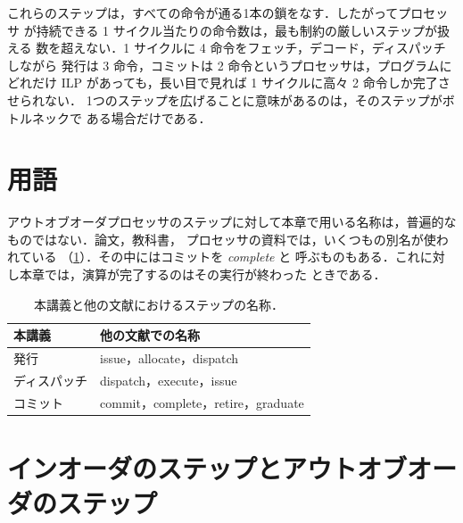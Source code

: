 \documentclass[../main.tex]{subfiles}
\begin{document}
これらのステップは，すべての命令が通る1本の鎖をなす．したがってプロセッサ
が持続できる 1 サイクル当たりの命令数は，最も制約の厳しいステップが扱える
数を超えない．1 サイクルに 4 命令をフェッチ，デコード，ディスパッチしながら
発行は 3 命令，コミットは 2 命令というプロセッサは，プログラムにどれだけ
ILP があっても，長い目で見れば 1 サイクルに高々 2 命令しか完了させられない．
1つのステップを広げることに意味があるのは，そのステップがボトルネックで
ある場合だけである．

\section{用語}
\label{sec:l08-terminology}

アウトオブオーダプロセッサのステップに対して本章で用いる名称は，普遍的な
ものではない．論文，教科書，
プロセッサの資料では，いくつもの別名が使われている
（\cref{tab:l08-terminology}）．その中にはコミットを \emph{complete} と
呼ぶものもある．これに対し本章では，演算が完了するのはその実行が終わった
ときである．

\begin{table}[htbp]
  \centering\small
  \caption{本講義と他の文献におけるステップの名称．}
  \label{tab:l08-terminology}
  \begin{tabular}{@{}ll@{}}
    \toprule
    本講義 & 他の文献での名称 \\
    \midrule
    発行 & issue，allocate，dispatch \\
    ディスパッチ & dispatch，execute，issue \\
    コミット & commit，complete，retire，graduate \\
    \bottomrule
  \end{tabular}
\end{table}

\section{インオーダのステップとアウトオブオーダのステップ}
\label{sec:l08-order}
\end{document}
